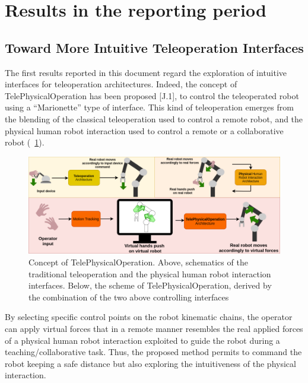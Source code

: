 \newpage
\section{Results in the reporting period}


\subsection{Toward More Intuitive Teleoperation Interfaces}
The first results reported in this document regard the exploration of intuitive interfaces for teleoperation architectures. Indeed, the concept of TelePhysicalOperation has been proposed [J.1], to control the teleoperated robot using a \enquote{Marionette} type of interface. This kind of teleoperation emerges from the blending of the classical teleoperation used to control a remote robot, and the physical human robot interaction used to control a remote or a collaborative robot (\figurename~\ref{fig:tposcheme}). 

\begin{figure}[H]
	\centering
	\includegraphics[width=0.9\linewidth]{img/TPOScheme}
	\caption{Concept of TelePhysicalOperation. Above, schematics of the traditional teleoperation and the physical human robot interaction interfaces. Below, the scheme of TelePhysicalOperation, derived by the combination of the two above controlling interfaces}
	\label{fig:tposcheme}
\end{figure}

By selecting specific control points on the robot kinematic chains, the operator can apply virtual forces that in a remote manner resembles the real applied forces of a physical human robot interaction exploited to guide the robot during a teaching/collaborative task. Thus, the proposed method permits to command the robot keeping a safe distance but also exploring the intuitiveness of the physical interaction. 

